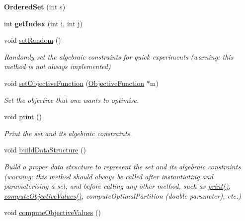 \begin{DoxyCompactItemize}
\item 
\hypertarget{classOrderedSet_a9cfaad9de53be413f85fadd9f25c8196}{{\bfseries Ordered\-Set} (int s)}\label{classOrderedSet_a9cfaad9de53be413f85fadd9f25c8196}

\item 
\hypertarget{classOrderedSet_a9b04f6f70c25ddfdb6539add1b806757}{int {\bfseries get\-Index} (int i, int j)}\label{classOrderedSet_a9b04f6f70c25ddfdb6539add1b806757}

\item 
\hypertarget{classOrderedSet_a907dcd3a18a9b363bf3150b4e28899bd}{void \hyperlink{classOrderedSet_a907dcd3a18a9b363bf3150b4e28899bd}{set\-Random} ()}\label{classOrderedSet_a907dcd3a18a9b363bf3150b4e28899bd}

\begin{DoxyCompactList}\small\item\em Randomly set the algebraic constraints for quick experiments (warning\-: this method is not always implemented) \end{DoxyCompactList}\item 
void \hyperlink{classOrderedSet_a6051e561b7b5fcd1dc5ee8f9f67353fe}{set\-Objective\-Function} (\hyperlink{classObjectiveFunction}{Objective\-Function} $\ast$m)
\begin{DoxyCompactList}\small\item\em Set the objective that one wants to optimise. \end{DoxyCompactList}\item 
\hypertarget{classOrderedSet_a3e1f7870eb9aeee5f6d74beab0786e37}{void \hyperlink{classOrderedSet_a3e1f7870eb9aeee5f6d74beab0786e37}{print} ()}\label{classOrderedSet_a3e1f7870eb9aeee5f6d74beab0786e37}

\begin{DoxyCompactList}\small\item\em Print the set and its algebraic constraints. \end{DoxyCompactList}\item 
\hypertarget{classOrderedSet_a6a9d6fdbf5ebcd43806a9f3e63126125}{void \hyperlink{classOrderedSet_a6a9d6fdbf5ebcd43806a9f3e63126125}{build\-Data\-Structure} ()}\label{classOrderedSet_a6a9d6fdbf5ebcd43806a9f3e63126125}

\begin{DoxyCompactList}\small\item\em Build a proper data structure to represent the set and its algebraic constraints (warning\-: this method should always be called after instantiating and parameterising a set, and before calling any other method, such as \hyperlink{classOrderedSet_a3e1f7870eb9aeee5f6d74beab0786e37}{print()}, \hyperlink{classOrderedSet_af3145e214c22b87a945988f5489d4aec}{compute\-Objective\-Values()}, compute\-Optimal\-Partition (double parameter), etc.) \end{DoxyCompactList}\item 
\hypertarget{classOrderedSet_af3145e214c22b87a945988f5489d4aec}{void \hyperlink{classOrderedSet_af3145e214c22b87a945988f5489d4aec}{compute\-Objective\-Values} ()}\label{classOrderedSet_af3145e214c22b87a945988f5489d4aec}


\end{DoxyCompactItemize}
